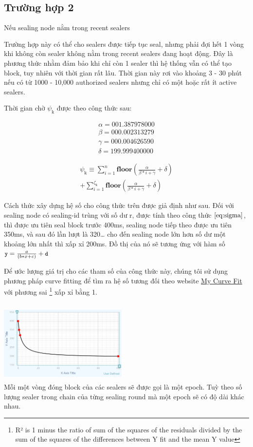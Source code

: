 \documentclass[12pt,oneside]{amsart}
\begin{document}
\begin{multicols}{2}
\subsection{Trường hợp 2} Nếu sealing node nằm trong recent sealers

Trường hợp này có thể cho sealers được tiếp tục seal, nhưng phải đợi hết 1 vòng khi không còn sealer không nằm trong recent sealers đang hoạt động. Đây là phương thức nhằm đảm bảo khi chỉ còn 1 sealer thì hệ thống vẫn có thể tạo block, tuy nhiên với thời gian rất lâu. Thời gian này rơi vào khoảng 3 - 30 phút nếu có từ 1000 - 10,000 authorized sealers nhưng chỉ có một hoặc rất ít active sealers.

Thời gian chờ $\psi_{\mathrm{k}}$ được theo công thức sau:

\begin{eqnarray}
\alpha = 001.387978000 \\
\beta = 000.002313279 \\
\gamma = 000.004626590 \\
\delta = 199.999400000
\end{eqnarray}

\begin{multline}\label{eq:psi_2}
\psi_{\mathrm{k}} \equiv \sum_{i=1}^{n} \mathbf{floor}(\frac{\alpha}{\beta*i+\gamma} + \delta) \\ 
+ \sum_{i=1}^{\zeta_\mathrm{k}} \mathbf{floor}(\frac{\alpha}{\beta*i+\gamma} + \delta)
\end{multline}

Cách thức xây dựng hệ số cho công thức trên được giả định như sau. Đối với sealing node có sealing-id trùng với số dư r, được tính theo công thức $\eqref{eq:sigma}$, thì được ưu tiên seal block trước 400ms, sealing node tiếp theo được ưu tiên 350ms, và sau đó lần lượt là 320… cho đến sealing node lớn hơn số dư một khoảng lớn nhất thì xấp xỉ 200ms. Đồ thị của nó sẽ tương ứng với hàm số $\texttt{\small y} = \frac{a} {(b * x + c)} + \texttt{\small d}$

Để ước lượng giá trị cho các tham số của công thức này, chúng tôi sử dụng phương pháp curve fitting để tìm ra hệ số tương đối theo website \href{https://mycurvefit.com/}{My Curve Fit} với phương sai \footnote{R² is 1 minus the ratio of sum of the squares of the residuals divided by the sum of the squares of the differences between Y fit and the mean Y value} xấp xỉ bằng 1.
\\
\\
\includegraphics[width=0.48\textwidth, height=4cm]{curve-fit}
\\
Mỗi một vòng đóng block của các sealers sẽ được gọi là một epoch. Tuỳ theo số lượng sealer trong chain của từng sealing round mà một epoch sẽ có độ dài khác nhau.


\end{multicols}
\end{document}
